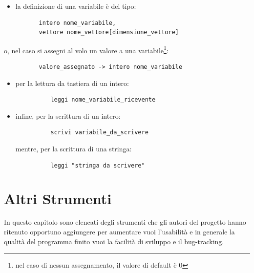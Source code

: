 \documentclass[11pt, a4paper, twoside, notitlepage]{report}
\begin{document}
\begin{itemize}
  \item la definizione di una variabile è del tipo:
\end{itemize}
 \begin{verbatim}
          intero nome_variabile,
          vettore nome_vettore[dimensione_vettore]
 \end{verbatim}
 o, nel caso si assegni al volo un valore a una variabile\footnote{nel caso di
 nessun assegnamento, il valore di default è 0}:
 
 \begin{verbatim}
          valore_assegnato -> intero nome_variabile
\end{verbatim}

\begin{itemize}
 \item per la lettura da tastiera di un intero:
\begin{verbatim}
          leggi nome_variabile_ricevente
\end{verbatim}
\item infine, per la scrittura di un intero:
\begin{verbatim}
          scrivi variabile_da_scrivere
\end{verbatim}
mentre, per la scrittura di una stringa:
\begin{verbatim}
          leggi "stringa da scrivere"
\end{verbatim}
\end{itemize} 
\chapter{Altri Strumenti}
In questo capitolo sono elencati degli strumenti che gli autori del progetto
hanno ritenuto opportuno aggiungere per aumentare vuoi l'usabilità e in generale
la qualità del programma finito vuoi la facilità di sviluppo e il bug-tracking.
\end{document}
